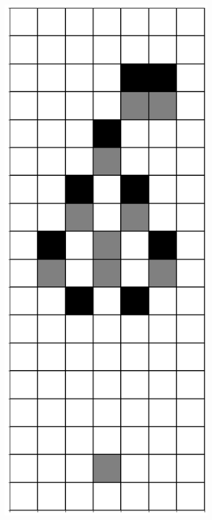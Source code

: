 \documentclass[12pt]{article}
\numberwithin{figure}{section} %
\begin{document}
\begin{figure}[H]
\begin{subfigure}{0.19\textwidth}
     \subcaption{}
   \end{subfigure}
           \begin{subfigure}{0.19\textwidth}
     \centering
     \includegraphics[width=\linewidth]{Section4/18.3}

\end{subfigure}
\end{figure}
\end{document}
